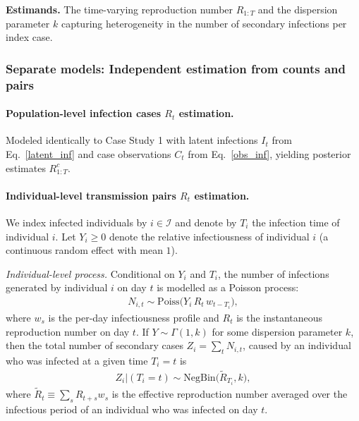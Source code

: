 \documentclass{article}
\begin{document}
\noindent\textbf{Estimands.} The time-varying reproduction number $R_{1:T}$ and the dispersion parameter $k$ capturing heterogeneity in the number of secondary infections per index case. 

\subsubsection{Separate models: Independent estimation from counts and pairs}

\paragraph{Population-level infection cases $R_t$ estimation.}
Modeled identically to Case Study 1 with latent infections $I_t$ from Eq.~\eqref{latent_inf} and case observations $C_t$ from  Eq.~\eqref{obs_inf}, yielding posterior estimates $R_{1:T}^c$.

\paragraph{Individual-level transmission pairs $R_t$ estimation.}
We index infected individuals by $i\in\mathcal{I}$ and denote by $T_i$ the infection time of individual $i$. Let $Y_i\ge0$ denote the relative infectiousness of individual $i$ (a continuous random effect with mean $1$).

\emph{Individual-level process.}  Conditional on $Y_i$ and $T_i$, the number of infections generated by individual $i$ on day $t$ is modelled as a Poisson process:
\begin{align}\label{cs3_ind_process}
N_{i,t} \sim \mathrm{Poiss}\!\big(Y_i\, R_t\, w_{t-T_i}\big), 
\end{align}
where $w_s$ is the per-day infectiousness profile and $R_t$ is the instantaneous reproduction number on day $t$. If $Y\sim \Gamma (1,k)$ for some dispersion parameter $k$, then the total  number of secondary cases $Z_i = \sum_{t} N_{i,t}$, caused by an individual who was infected at a given time $T_i=t$  is
\begin{align}\label{offspring_cases}
Z_i |(T_i=t)\sim \mathrm{NegBin}\!\Big(\tilde{R}_{T_i}, k\Big), 
\end{align}
where $\widetilde{R}_t \equiv \sum_{s} R_{t+s} w_s$ is the effective reproduction number averaged over the infectious period of an individual who was infected on day $t$.
\end{document}
